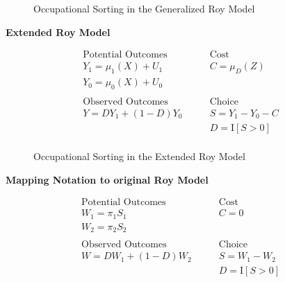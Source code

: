 \begin{frame}
\begin{figure}[htp]\centering
\caption{Occupational Sorting in the Generalized Roy Model}\label{Occupational Sorting in the Generalized Roy Model}
\end{figure}
\end{frame}


\begin{frame}
\textbf{Extended Roy Model}

\begin{align*}
\text{Potential Outcomes} &\qquad \text{Cost} \\
Y_1 = \mu_1(X) + U_1      &\qquad C = \mu_D(Z) \\
Y_0 = \mu_0(X) + U_0      &\qquad \\
    & \\
\text{Observed Outcomes } &\qquad \text{Choice} \\
Y = D Y_1 + (1 - D)Y_0 &\qquad S = Y_1 - Y_0 - C \\
                       &\qquad D = \mathrm{I}[S > 0] \\
\end{align*}

\end{frame}




\begin{frame}
\begin{figure}[htp]\centering
\caption{Occupational Sorting in the Extended Roy Model}\label{Occupational Sorting in the Extended Roy Model}
\end{figure}
\end{frame}




\begin{frame}
\textbf{Mapping Notation to original Roy Model}

\begin{align*}
\text{Potential Outcomes} &\qquad \text{Cost} \\
W_1 = \pi_1 S_1      &\qquad C = 0 \\
W_2 = \pi_2 S_2       &\qquad \\
    & \\
\text{Observed Outcomes } &\qquad \text{Choice} \\
W = D W_1 + (1 - D)W_2 &\qquad S = W_1 - W_2 \\
                       &\qquad D = \mathrm{I}[S > 0] \\
\end{align*}
\end{frame}

